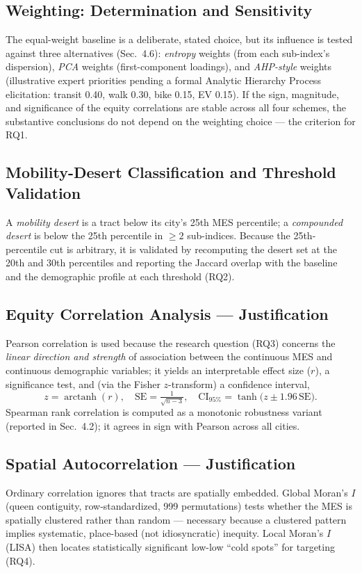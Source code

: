 \documentclass[11pt]{article}
\begin{document}
\subsection{Weighting: Determination and Sensitivity}
The equal-weight baseline is a deliberate, stated choice, but its influence is
tested against three alternatives (Sec.~4.6): \emph{entropy} weights (from each
sub-index's dispersion), \emph{PCA} weights (first-component loadings), and
\emph{AHP-style} weights (illustrative expert priorities pending a formal Analytic
Hierarchy Process elicitation: transit 0.40, walk 0.30, bike 0.15, EV 0.15). If the sign, magnitude, and significance of the equity correlations are
stable across all four schemes, the substantive conclusions do not depend on the
weighting choice --- the criterion for RQ1.

\subsection{Mobility-Desert Classification and Threshold Validation}
A \emph{mobility desert} is a tract below its city's 25th MES percentile; a
\emph{compounded desert} is below the 25th percentile in $\geq 2$ sub-indices.
Because the 25th-percentile cut is arbitrary, it is validated by recomputing the
desert set at the 20th and 30th percentiles and reporting the Jaccard overlap
with the baseline and the demographic profile at each threshold (RQ2).

\subsection{Equity Correlation Analysis --- Justification}
Pearson correlation is used because the research question (RQ3) concerns the
\emph{linear direction and strength} of association between the continuous MES and
continuous demographic variables; it yields an interpretable effect size ($r$),
a significance test, and (via the Fisher $z$-transform) a confidence interval,
\[
z=\operatorname{arctanh}(r),\quad \mathrm{SE}=\tfrac{1}{\sqrt{n-3}},\quad
\mathrm{CI}_{95\%}=\tanh\!\big(z\pm1.96\,\mathrm{SE}\big).
\]
Spearman rank correlation is computed as a monotonic robustness variant
(reported in Sec.~4.2); it agrees in sign with Pearson across all cities.

\subsection{Spatial Autocorrelation --- Justification}
Ordinary correlation ignores that tracts are spatially embedded. Global Moran's
$I$ (queen contiguity, row-standardized, 999 permutations) tests whether the MES
is spatially clustered rather than random --- necessary because a clustered
pattern implies systematic, place-based (not idiosyncratic) inequity. Local
Moran's $I$ (LISA) then locates statistically significant low-low ``cold spots''
for targeting (RQ4).
\end{document}
